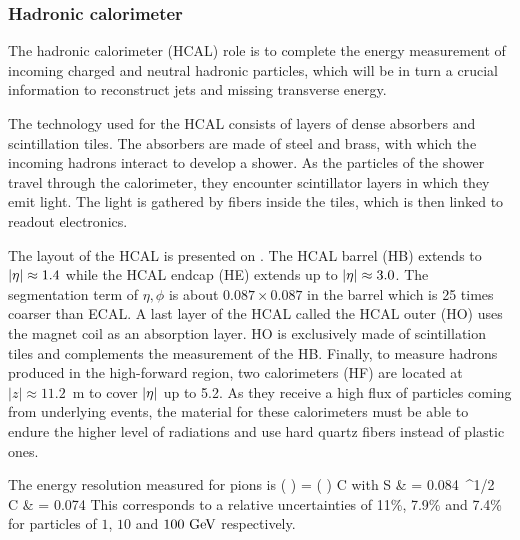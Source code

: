         \subsubsection{Hadronic calorimeter}

    The hadronic calorimeter (HCAL) role is to complete the energy measurement of incoming charged
    and neutral hadronic particles, which will be in turn a crucial information to
    reconstruct jets and missing transverse energy.

    The technology used for the HCAL consists of layers of dense absorbers and
    scintillation tiles. The absorbers are made of steel and brass, with which
    the incoming hadrons interact to develop a shower. As the particles of the shower
    travel through the calorimeter, they encounter scintillator layers in which they
    emit light. The light is gathered by fibers inside the tiles, which is then
    linked to readout electronics.


    The layout of the HCAL is presented on . The HCAL barrel
    (HB) extends to $\left| \eta \right| \approx 1.4$ while the HCAL endcap (HE) extends up to
    $\left| \eta \right| \approx 3.0$. The segmentation term of $\eta,\phi$ is about $0.087 \times 0.087$
    in the barrel which is 25 times coarser than ECAL. A last layer of the HCAL called
    the HCAL outer (HO) uses the magnet coil as an absorption layer. HO is exclusively
    made of scintillation tiles and complements the measurement of the HB. Finally, to
    measure hadrons produced in the high-forward region, two calorimeters (HF) are located at
    $\left|z\right| \approx 11.2$~m to cover $\left| \eta \right|$ up to 5.2. As they receive a high flux of
    particles coming from underlying events, the material for these calorimeters must
    be able to endure the higher level of radiations and use hard quartz fibers instead of
    plastic ones.

    The energy resolution measured for pions is 
    {
        \left(  \right)
        =
        \left(  \right)
        \oplus
        C
    }
    with
    {
        S & = 0.084~^{1/2} \\
        C & = 0.074\nonumber
    }
    This corresponds to a relative uncertainties of 11\%, 7.9\% and 7.4\% for particles
    of $1$, $10$ and $100~\text{GeV}$ respectively.

